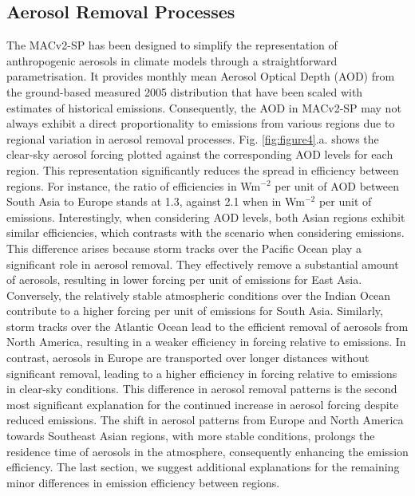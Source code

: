 \documentclass[draft]{agujournal2019}
\begin{document}
      \subsection{Aerosol Removal Processes}
            The MACv2-SP has been designed to simplify the representation of anthropogenic aerosols in climate models through a straightforward parametrisation. 
            It provides monthly mean Aerosol Optical Depth (AOD) from the ground-based measured 2005 distribution that have been scaled with estimates of historical emissions. 
            Consequently, the AOD in MACv2-SP may not always exhibit a direct proportionality to emissions from various regions due to regional variation in aerosol removal processes.
            Fig. \ref{fig:figure4}.a. shows the clear-sky aerosol forcing plotted against the corresponding AOD levels for each region. This representation significantly reduces the spread in efficiency between regions. For instance, the ratio of efficiencies in Wm$^{-2}$ per unit of AOD between South Asia to Europe stands at 1.3, against 2.1 when in Wm$^{-2}$ per unit of emissions. 
            Interestingly, when considering AOD levels, both Asian regions exhibit similar efficiencies, which contrasts with the scenario when considering emissions. This difference arises because storm tracks over the Pacific Ocean play a significant role in aerosol removal. They effectively remove a substantial amount of aerosols, resulting in lower forcing per unit of emissions for East Asia. Conversely, the relatively stable atmospheric conditions over the Indian Ocean contribute to a higher forcing per unit of emissions for South Asia.
            Similarly, storm tracks over the Atlantic Ocean lead to the efficient removal of aerosols from North America, resulting in a weaker efficiency in forcing relative to emissions. In contrast, aerosols in Europe are transported over longer distances without significant removal, leading to a higher efficiency in forcing relative to emissions in clear-sky conditions.
            This difference in aerosol removal patterns is the second most significant explanation for the continued increase in aerosol forcing despite reduced emissions. The shift in aerosol patterns from Europe and North America towards Southeast Asian regions, with more stable conditions, prolongs the residence time of aerosols in the atmosphere, consequently enhancing the emission efficiency.
            The last section, we suggest additional explanations for the remaining minor differences in emission efficiency between regions.
\end{document}
